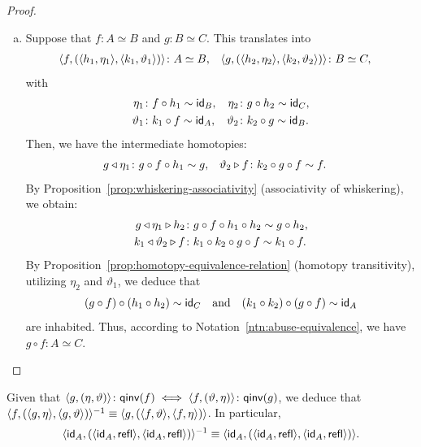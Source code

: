 \begin{proof}
\begin{enumerate}[a)]
        \item Suppose that\/ $f\colon A\simeq B$ and\/ $g\colon B\simeq C$. This translates into
        \begin{align*}
            \dep{f,(\dep{h_1,\eta_1},\dep{k_1,\vartheta_1})}
                &\colon A\simeq B, &
            \dep{g,(\dep{h_2,\eta_2},\dep{k_2,\vartheta_2})}
                &\colon B\simeq C,
        \end{align*}
        with
        \begin{align*}
            \eta_1 &\colon f\circ h_1\sim\id_B, &
            \eta_2 &\colon g\circ h_2\sim\id_C, \\
            \vartheta_1 &\colon k_1\circ f\sim\id_A, &
            \vartheta_2 &\colon k_2\circ g\sim\id_B.
        \end{align*}
        Then, we have the intermediate homotopies:
        \begin{align*}
            g\lwct\eta_1 &\colon g\circ f\circ h_1\sim g, &
            \vartheta_2\rwct f &\colon k_2\circ g\circ f\sim f.
        \end{align*}
        By Proposition~\ref{prop:whiskering-associativity} (associativity of whiskering), we obtain:
        \begin{align*}
            g\lwct\eta_1\rwct h_2 &\colon g\circ f\circ h_1\circ h_2\sim g\circ h_2, \\
            k_1\lwct\vartheta_2\rwct f &\colon k_1\circ k_2\circ g\circ f\sim k_1\circ f.
        \end{align*}
        By Proposition~\ref{prop:homotopy-equivalence-relation} (homotopy transitivity), utilizing\/ $\eta_2$ and\/ $\vartheta_1$, we deduce that
        \[
            (g\circ f)\circ(h_1\circ h_2)\sim \mathsf{id}_C
            \quad\text{and}\quad
            (k_1\circ k_2)\circ(g\circ f)\sim\mathsf{id}_A
        \]
        are inhabited. Thus, according to Notation~\ref{ntn:abuse-equivalence}, we have\/ $g\circ f\colon A\simeq C$.
    \end{enumerate}
\end{proof}

\begin{rem}\label{rem:id-equivalence-inverse}
    Given that $\dep{g,(\eta,\vartheta)}\colon\fun{qinv}(f)\iff\dep{f,(\vartheta,\eta)}\colon\fun{qinv}(g)$,
    we deduce that $\langle f,(\langle g,\eta\rangle,\langle g,\vartheta\rangle)\rangle^{-1}\equiv\langle g,(\langle f,\vartheta\rangle,\langle f,\eta\rangle)\rangle$. In particular,
    \[
        \langle\mathsf{id}_A,
        (\langle\mathsf{id}_A,\mathsf{refl}\rangle,\langle\mathsf{id}_A,\mathsf{refl}\rangle)\rangle^{-1}
        \equiv\langle\mathsf{id}_A,
        (\langle\mathsf{id}_A,\mathsf{refl}\rangle,\langle\mathsf{id}_A,\mathsf{refl}\rangle)\rangle.
    \]
\end{rem}

